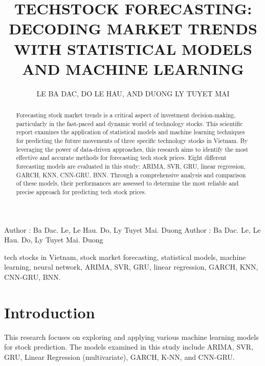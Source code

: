 \documentclass{ieeeojies}
\begin{document}
\title{TECHSTOCK FORECASTING: DECODING MARKET TRENDS WITH STATISTICAL MODELS AND MACHINE LEARNING}
\author{\uppercase{Le Ba Dac},
\uppercase{Do Le Hau, and Duong Ly Tuyet Mai}}
 
\address[1]{Faculty of Information Systems, University of Information Technology, (e-mail: 21521911@gm.uit.edu.vn)}
\address[2]{Faculty of Information Systems, University of Information Technology, (e-mail: 21522052@gm.uit.edu.vn)}
\address[3]{Faculty of Information Systems, University of Information Technology, (e-mail: 21522318@gm.uit.edu.vn)}

\markboth
{Author \headeretal: Ba Dac. Le, Le Hau. Do, Ly Tuyet Mai. Duong}
{Author \headeretal: Ba Dac. Le, Le Hau. Do, Ly Tuyet Mai. Duong}
\begin{abstract}
Forecasting stock market trends is a critical aspect of investment decision-making, particularly in the fast-paced and dynamic world of technology stocks. This scientific report examines the application of statistical models and machine learning techniques for predicting the future movements of three specific technology stocks in Vietnam. By leveraging the power of data-driven approaches, this research aims to identify the most effective and accurate methods for forecasting tech stock prices. Eight different forecasting models are evaluated in this study: ARIMA, SVR, GRU, linear regression, GARCH, KNN, CNN-GRU, BNN. Through a comprehensive analysis and comparison of these models, their performances are assessed to determine the most reliable and precise approach for predicting tech stock prices.
\end{abstract}

\begin{keywords}
tech stocks in Vietnam, stock market forecasting, statistical models, machine learning, neural network, ARIMA, SVR, GRU, linear regression, GARCH, KNN, CNN-GRU, BNN.
\end{keywords}

\titlepgskip=-15pt

\maketitle

\section{Introduction}
\label{sec:introduction}
This research focuses on exploring and applying various machine learning models for stock prediction. The models examined in this study include ARIMA, SVR, GRU, Linear Regression (multivariate), GARCH, K-NN, and CNN-GRU.
\end{document}
